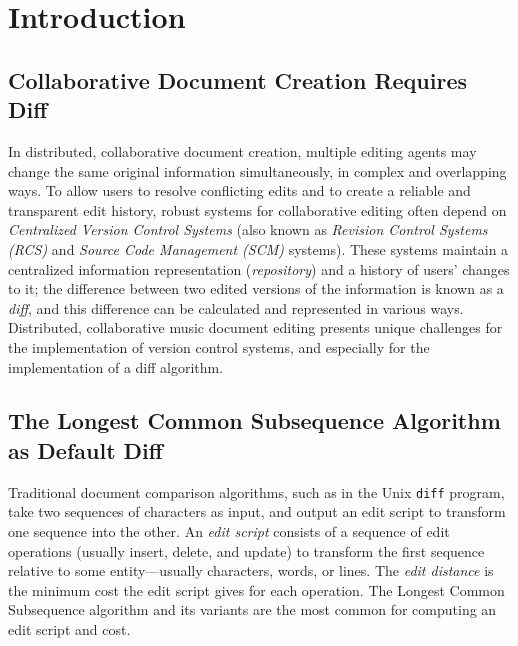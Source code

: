 \documentclass{article}
\title{\papertitle}
\begin{document}
%
\capstartfalse
\maketitle
\capstarttrue
%
\begin{abstract}
We describe an application of hierarchic diff to the collaborative
editing of tree-based music representations, using Zhang and Shasha's
tree edit distance algorithm as implemented within the XUDiff tool.
The edit distance between two trees is the minimum number of edit
operations necessary to transform one tree into the other.  We
consider common operations on the score tree---deleting, changing, and
appending tree nodes---to derive a minimal edit sequence, known as an
edit script, and we compare the performance of the widely used Longest
Common Subsequence algorithm against our approach. We conclude by summarizing implications for the design of collaborative music document software systems.
\end{abstract}
%

\section{Introduction}\label{sec:introduction}
\subsection{Collaborative Document Creation Requires Diff}
In distributed, collaborative document creation, multiple editing agents may change the same original information simultaneously, in complex and overlapping ways. To allow users to resolve conflicting edits and to create a reliable and transparent edit history, robust systems for collaborative editing often depend on \emph{Centralized Version Control Systems} (also known as \emph{Revision Control Systems (RCS)} and \emph{Source Code Management (SCM)} systems). These systems maintain a centralized information representation (\emph{repository}) and a history of users' changes to it; the difference between two edited versions of the information is known as a \emph{diff}, and this difference can be calculated and represented in various ways. Distributed, collaborative music document editing presents unique challenges for the implementation of version control systems, and especially for the implementation of a diff algorithm.

\subsection{The Longest Common Subsequence Algorithm as Default Diff}
Traditional document comparison algorithms, such as in the Unix
\texttt{diff} program, take two sequences of characters as input, and
output an edit script to transform one sequence into the other.  An
\emph{edit script} consists of a sequence of edit operations (usually
insert, delete, and update) to transform the first sequence relative
to some entity---usually characters, words, or lines.  The \emph{edit
  distance} is the minimum cost the edit script gives for each
operation.  The Longest Common Subsequence algorithm and its variants
are the most common for computing an edit script and cost.
\end{document}
